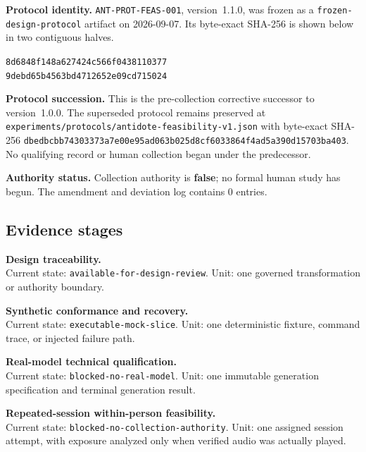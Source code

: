 
\noindent\textbf{Protocol identity.} \texttt{ANT-PROT-FEAS-001}, version~1.1.0, was frozen as a \texttt{frozen-design-protocol} artifact on 2026-09-07. Its byte-exact SHA-256 is shown below in two contiguous halves.
\begin{center}
  \small\texttt{8d6848f148a627424c566f0438110377}\\[-0.2em]
  \small\texttt{9debd65b4563bd4712652e09cd715024}
\end{center}

\noindent\textbf{Protocol succession.} This is the pre-collection corrective successor to version~1.0.0. The superseded protocol remains preserved at \nolinkurl{experiments/protocols/antidote-feasibility-v1.json} with byte-exact SHA-256 \nolinkurl{dbedbcbb74303373a7e00e95ad063b025d8cf6033864f4ad5a390d15703ba403}. No qualifying record or human collection began under the predecessor.

\noindent\textbf{Authority status.} Collection authority is \textbf{false}; no formal human study has begun. The amendment and deviation log contains 0 entries.

\subsection*{Evidence stages}
\begin{description}[leftmargin=3.3em,style=nextline,itemsep=0.45em]
  \item[\texttt{D0}] \textbf{Design traceability.}\\ Current state: \nolinkurl{available-for-design-review}. Unit: one governed transformation or authority boundary.
  \item[\texttt{T0}] \textbf{Synthetic conformance and recovery.}\\ Current state: \nolinkurl{executable-mock-slice}. Unit: one deterministic fixture, command trace, or injected failure path.
  \item[\texttt{T1}] \textbf{Real-model technical qualification.}\\ Current state: \nolinkurl{blocked-no-real-model}. Unit: one immutable generation specification and terminal generation result.
  \item[\texttt{H1}] \textbf{Repeated-session within-person feasibility.}\\ Current state: \nolinkurl{blocked-no-collection-authority}. Unit: one assigned session attempt, with exposure analyzed only when verified audio was actually played.
\end{description}

